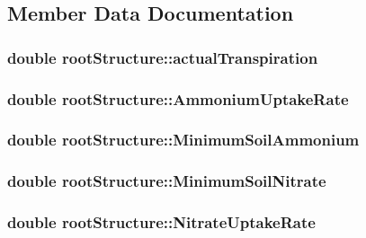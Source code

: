 \subsection{Member Data Documentation}
\hypertarget{structroot_structure_ac5932526da0cac056674b385da3b52a1}{
\subsubsection[{actualTranspiration}]{\setlength{\rightskip}{0pt plus 5cm}double {\bf rootStructure::actualTranspiration}}}
\label{structroot_structure_ac5932526da0cac056674b385da3b52a1}
\hypertarget{structroot_structure_a5a6c705454eeafeb83624a2351b53cf1}{
\subsubsection[{AmmoniumUptakeRate}]{\setlength{\rightskip}{0pt plus 5cm}double {\bf rootStructure::AmmoniumUptakeRate}}}
\label{structroot_structure_a5a6c705454eeafeb83624a2351b53cf1}
\hypertarget{structroot_structure_a80208bc0dea6228779648359e9bd1c01}{
\subsubsection[{MinimumSoilAmmonium}]{\setlength{\rightskip}{0pt plus 5cm}double {\bf rootStructure::MinimumSoilAmmonium}}}
\label{structroot_structure_a80208bc0dea6228779648359e9bd1c01}
\hypertarget{structroot_structure_a51bcb0f431a64a3b26d21a4e86a9d16e}{
\subsubsection[{MinimumSoilNitrate}]{\setlength{\rightskip}{0pt plus 5cm}double {\bf rootStructure::MinimumSoilNitrate}}}
\label{structroot_structure_a51bcb0f431a64a3b26d21a4e86a9d16e}
\hypertarget{structroot_structure_a6279d30c06e19a3e088f57fd6d793ed9}{
\subsubsection[{NitrateUptakeRate}]{\setlength{\rightskip}{0pt plus 5cm}double {\bf rootStructure::NitrateUptakeRate}}}

